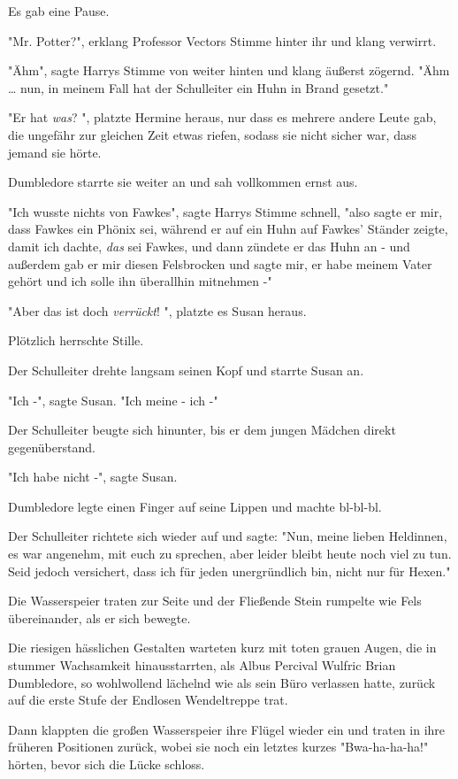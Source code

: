 {Es gab eine Pause.

"Mr. Potter?", erklang Professor Vectors Stimme hinter ihr und klang verwirrt.

"Ähm", sagte Harrys Stimme von weiter hinten und klang äußerst zögernd. "Ähm … nun, in meinem Fall hat der Schulleiter ein Huhn in Brand gesetzt."

"Er hat \emph{was}? ", platzte Hermine heraus, nur dass es mehrere andere Leute gab, die ungefähr zur gleichen Zeit etwas riefen, sodass sie nicht sicher war, dass jemand sie hörte.

Dumbledore starrte sie weiter an und sah vollkommen ernst aus.

"Ich wusste nichts von Fawkes", sagte Harrys Stimme schnell, "also sagte er mir, dass Fawkes ein Phönix sei, während er auf ein Huhn auf Fawkes' Ständer zeigte, damit ich dachte, \emph{das} sei Fawkes, und dann zündete er das Huhn an - und außerdem gab er mir diesen Felsbrocken und sagte mir, er habe meinem Vater gehört und ich solle ihn überallhin mitnehmen -"

"Aber das ist doch \emph{verrückt}! ", platzte es Susan heraus.

Plötzlich herrschte Stille.

Der Schulleiter drehte langsam seinen Kopf und starrte Susan an.

"Ich -", sagte Susan. "Ich meine - ich -"

Der Schulleiter beugte sich hinunter, bis er dem jungen Mädchen direkt gegenüberstand.

"Ich habe nicht -", sagte Susan.

Dumbledore legte einen Finger auf seine Lippen und machte bl-bl-bl.

Der Schulleiter richtete sich wieder auf und sagte: "Nun, meine lieben Heldinnen, es war angenehm, mit euch zu sprechen, aber leider bleibt heute noch viel zu tun. Seid jedoch versichert, dass ich für jeden unergründlich bin, nicht nur für Hexen."

Die Wasserspeier traten zur Seite und der Fließende Stein rumpelte wie Fels übereinander, als er sich bewegte.

Die riesigen hässlichen Gestalten warteten kurz mit toten grauen Augen, die in stummer Wachsamkeit hinausstarrten, als Albus Percival Wulfric Brian Dumbledore, so wohlwollend lächelnd wie als sein Büro verlassen hatte, zurück auf die erste Stufe der Endlosen Wendeltreppe trat.

Dann klappten die großen Wasserspeier ihre Flügel wieder ein und traten in ihre früheren Positionen zurück, wobei sie noch ein letztes kurzes "Bwa-ha-ha-ha!" hörten, bevor sich die Lücke schloss.

}
